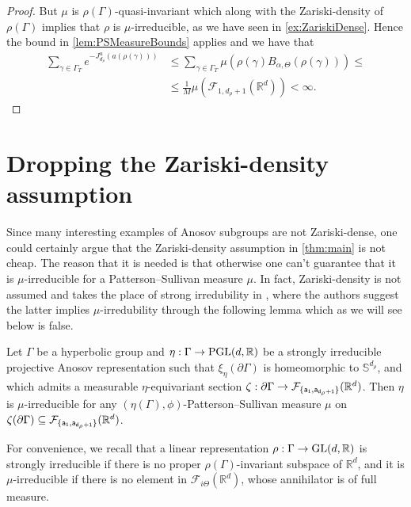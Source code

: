 \documentclass{report}
\begin{document}
\begin{proof}
    But $\mu$ is $\rho(\Gamma)$-quasi-invariant which along with the Zariski-density of $\rho(\Gamma)$ implies that $\rho$ is $\mu$-irreducible, as we have seen in \cref{ex:ZariskiDense}.
    Hence the bound in \cref{lem:PSMeasureBounds} applies and we have that
    \begin{align*}
        \sum_{\gamma \in \Gamma_T} e^{-J_{d_\rho}^u(a(\rho(\gamma)))} &\leq
        \sum_{\gamma \in \Gamma_T} \mu\left(\rho(\gamma) B_{\alpha, \Theta}(\rho(\gamma))\right) \leq\\
        &\leq
        \frac{1}{M} \mu\left(\mathcal F_{1, d_\rho + 1}(\mathbb R^d)\right) < \infty.
    \end{align*}

    
\end{proof}

\chapter{Dropping the Zariski-density assumption}\label{ch:no_zariski_density}
Since many interesting examples of Anosov subgroups are not Zariski-dense, one could certainly argue that the Zariski-density assumption in \cref{thm:main} is not cheap.
The reason that it is needed is that otherwise one can't guarantee that it is $\mu$-irreducible for a Patterson--Sullivan measure $\mu$. 
In fact, Zariski-density is not assumed and takes the place of strong irredubility in \cite{pozzetti_anosov_2023}, where the authors suggest the latter implies $\mu$-irredubility through the following lemma which as we will see below is false.

\begin{lemma}\label{lem:irreducibility}
Let $\Gamma$ be a hyperbolic group and $\eta:\Gamma \to \operatorname{{\mathrm{PGL}}}(d, \mathbb R)$ be a strongly irreducible projective Anosov representation such that $\xi_\eta(\partial \Gamma)$ is homeomorphic to $\mathbb S^{d_\rho}$, and which admits a measurable $\eta$-equivariant section
$\zeta: \partial \Gamma \to \mathcal F_{\{ \sf a_1, \sf a_{d_\rho + 1}\}} (\mathbb R^d)$.
Then $\eta$ is $\mu$-irreducible for any $(\eta(\Gamma), \phi)$-Patterson--Sullivan measure $\mu$ on $\zeta(\partial \Gamma) \subseteq \mathcal F_{\{ \sf a_1, \sf a_{d_\rho + 1}\}} (\mathbb R^d)$.
\end{lemma}

For convenience, we recall that a linear representation $\rho: \Gamma \to \operatorname{{\mathrm{GL}}}(d, \mathbb R)$ is strongly irreducible if there is no proper $\rho(\Gamma)$-invariant subspace of $\mathbb R^d$,
and it is $\mu$-irreducible if there is no element in $\mathcal F_{i \Theta}(\mathbb R^d)$, whose annihilator is of full measure.
\end{document}
